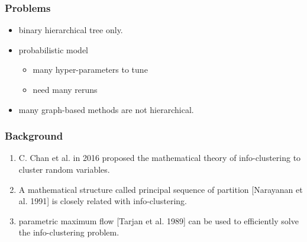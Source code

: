 \documentclass[notheorems]{beamer}
\begin{document}
\begin{frame}
\frametitle{Problems}
\begin{itemize}
\item binary hierarchical tree only.
\item probabilistic model
\begin{itemize}
\item many hyper-parameters to tune 
\item need many reruns
\end{itemize}
\item many graph-based methods are not hierarchical.
\end{itemize}
\end{frame}
\begin{frame}
	\frametitle{Background}
	\begin{enumerate}
		\item C. Chan et al. in 2016 proposed the mathematical theory of info-clustering to cluster random variables.
		\item A mathematical structure called principal sequence of partition [Narayanan et al. 1991] is closely related with info-clustering.
		\item parametric maximum flow [Tarjan et al. 1989] can be used to efficiently solve the info-clustering problem.
	\end{enumerate}
\end{frame}
\end{document}
